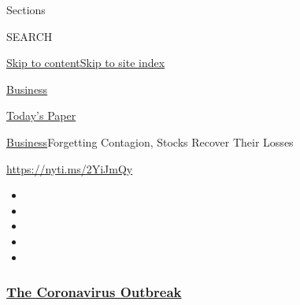 Sections

SEARCH

\protect\hyperlink{site-content}{Skip to
content}\protect\hyperlink{site-index}{Skip to site index}

\href{https://www.nytimes3xbfgragh.onion/section/business}{Business}

\href{https://myaccount.nytimes3xbfgragh.onion/auth/login?response_type=cookie\&client_id=vi}{}

\href{https://www.nytimes3xbfgragh.onion/section/todayspaper}{Today's
Paper}

\href{/section/business}{Business}\textbar{}Forgetting Contagion, Stocks
Recover Their Losses

\url{https://nyti.ms/2YiJmQy}

\begin{itemize}
\item
\item
\item
\item
\item
\end{itemize}

\hypertarget{the-coronavirus-outbreak}{%
\subsubsection{\texorpdfstring{\href{https://www.nytimes3xbfgragh.onion/news-event/coronavirus?name=styln-coronavirus-markets\&region=TOP_BANNER\&block=storyline_menu_recirc\&action=click\&pgtype=Article\&impression_id=90442ff0-f52e-11ea-a263-739fdfaf6370\&variant=undefined}{The
Coronavirus
Outbreak}}{The Coronavirus Outbreak}}\label{the-coronavirus-outbreak}}

